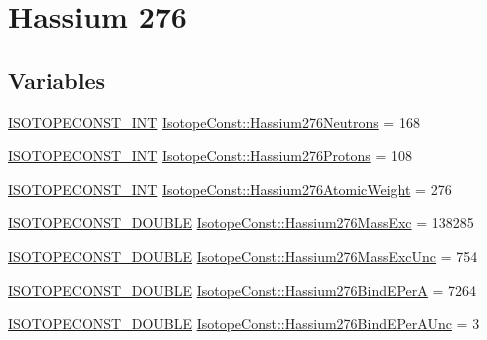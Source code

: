 \hypertarget{group___isotope_const-_hassium-_hs276}{}\section{Hassium 276}
\label{group___isotope_const-_hassium-_hs276}
\subsection*{Variables}
\begin{DoxyCompactItemize}
\item 
\mbox{\hyperlink{group___isotope_const-_macros_ga5f18360b3e99483a35c32d789e62621c}{I\+S\+O\+T\+O\+P\+E\+C\+O\+N\+S\+T\+\_\+\+I\+NT}} \mbox{\hyperlink{group___isotope_const-_hassium-_hs276_gaa89ec51278194291a2d76fb249fea580}{Isotope\+Const\+::\+Hassium276\+Neutrons}} = 168
\item 
\mbox{\hyperlink{group___isotope_const-_macros_ga5f18360b3e99483a35c32d789e62621c}{I\+S\+O\+T\+O\+P\+E\+C\+O\+N\+S\+T\+\_\+\+I\+NT}} \mbox{\hyperlink{group___isotope_const-_hassium-_hs276_ga29d1bbfd4a5cab582f61a43c714a57a7}{Isotope\+Const\+::\+Hassium276\+Protons}} = 108
\item 
\mbox{\hyperlink{group___isotope_const-_macros_ga5f18360b3e99483a35c32d789e62621c}{I\+S\+O\+T\+O\+P\+E\+C\+O\+N\+S\+T\+\_\+\+I\+NT}} \mbox{\hyperlink{group___isotope_const-_hassium-_hs276_ga74b744f56ff549f9c3c999d75818b4f7}{Isotope\+Const\+::\+Hassium276\+Atomic\+Weight}} = 276
\item 
\mbox{\hyperlink{group___isotope_const-_macros_ga8f45a7272ce02c0b4c65c44636ed719a}{I\+S\+O\+T\+O\+P\+E\+C\+O\+N\+S\+T\+\_\+\+D\+O\+U\+B\+LE}} \mbox{\hyperlink{group___isotope_const-_hassium-_hs276_ga5770d79e83182ccaff54293a1d327553}{Isotope\+Const\+::\+Hassium276\+Mass\+Exc}} = 138285
\item 
\mbox{\hyperlink{group___isotope_const-_macros_ga8f45a7272ce02c0b4c65c44636ed719a}{I\+S\+O\+T\+O\+P\+E\+C\+O\+N\+S\+T\+\_\+\+D\+O\+U\+B\+LE}} \mbox{\hyperlink{group___isotope_const-_hassium-_hs276_ga6e61e28b9cd8cb5a97088e9086a889b7}{Isotope\+Const\+::\+Hassium276\+Mass\+Exc\+Unc}} = 754
\item 
\mbox{\hyperlink{group___isotope_const-_macros_ga8f45a7272ce02c0b4c65c44636ed719a}{I\+S\+O\+T\+O\+P\+E\+C\+O\+N\+S\+T\+\_\+\+D\+O\+U\+B\+LE}} \mbox{\hyperlink{group___isotope_const-_hassium-_hs276_ga2efb138b9f434533d8883ff4c5ad384a}{Isotope\+Const\+::\+Hassium276\+Bind\+E\+PerA}} = 7264
\item 
\mbox{\hyperlink{group___isotope_const-_macros_ga8f45a7272ce02c0b4c65c44636ed719a}{I\+S\+O\+T\+O\+P\+E\+C\+O\+N\+S\+T\+\_\+\+D\+O\+U\+B\+LE}} \mbox{\hyperlink{group___isotope_const-_hassium-_hs276_ga4e1421d0cae00aec140bdd0c3c168f16}{Isotope\+Const\+::\+Hassium276\+Bind\+E\+Per\+A\+Unc}} = 3

\end{DoxyCompactItemize}
